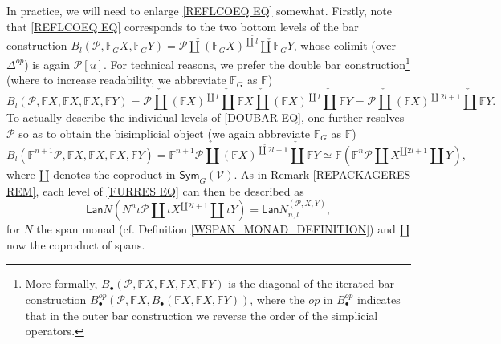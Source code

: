 \documentclass[a4paper,10pt
,draft
]{article}%
\numberwithin{equation}{section}
\numberwithin{figure}{section}
\theoremstyle{definition} %
\newcommand{\1}{\ensuremath{\mathbbm 1}}%
\begin{document}
In practice, we will need to enlarge 
\eqref{REFLCOEQ EQ} somewhat.
Firstly, note that \eqref{REFLCOEQ EQ}
corresponds to the two bottom levels of the bar construction
$B_l(\mathcal{P}, \mathbb{F}_G X, \mathbb{F}_G Y)=
\mathcal{P} \mathbin{\check{\amalg}}
(\mathbb{F}_G X)^{\check{\amalg} l} 
\mathbin{\check{\amalg}} \mathbb{F}_G Y$,
whose colimit (over $\Delta^{op}$) is again $\mathcal{P}[u]$.
For technical reasons, we prefer 
the double bar construction\footnote{
More formally,
$B_{\bullet}(\mathcal{P}, \mathbb{F} X, \mathbb{F} X, \mathbb{F} X, \mathbb{F} Y)$
is the diagonal
of the iterated bar construction
$B^{op}_{\bullet}\left(\mathcal{P}, \mathbb{F} X, 
B_{\bullet}(\mathbb{F} X, \mathbb{F} X, \mathbb{F} Y)\right)$,
where the $op$ in $B^{op}_{\bullet}$ indicates that in the outer bar construction we reverse the order of the simplicial operators.
}
(where to increase readability, we 
abbreviate $\mathbb{F}_G$ as $\mathbb{F}$)
\begin{equation}\label{DOUBAR EQ}
	B_l(\mathcal{P}, \mathbb{F} X, \mathbb{F} X, \mathbb{F} X, \mathbb{F} Y)
=
	\mathcal{P} \mathbin{\check{\amalg}}
	(\mathbb{F} X)^{\check{\amalg} l} 
	\mathbin{\check{\amalg}}
	\mathbb{F} X
	\mathbin{\check{\amalg}}
	(\mathbb{F} X)^{\check{\amalg} l} 
	\mathbin{\check{\amalg}} \mathbb{F} Y
=
	\mathcal{P} \mathbin{\check{\amalg}}
	(\mathbb{F} X)^{\check{\amalg} 2l+1} 
	\mathbin{\check{\amalg}} \mathbb{F} Y.
\end{equation}
To actually describe the individual levels of \eqref{DOUBAR EQ},
one further resolves $\mathcal{P}$
so as to obtain the bisimplicial object
(we again abbreviate $\mathbb{F}_G$ as $\mathbb{F}$)
\begin{equation}\label{FURRES EQ}
	B_l(\mathbb{F}^{n+1}\mathcal{P}, \mathbb{F} X, \mathbb{F} X, \mathbb{F} X, \mathbb{F} Y)
=
	\mathbb{F}^{n+1}\mathcal{P} \mathbin{\check{\amalg}}
	(\mathbb{F} X)^{\check{\amalg} 2l+1} 
	\mathbin{\check{\amalg}} \mathbb{F} Y
\simeq
	\mathbb{F}\left(
		\mathbb{F}^{n} \mathcal{P} \amalg
		X^{\amalg 2l+1} \amalg Y
	\right),
\end{equation}
where $\amalg$ denotes the coproduct in $\mathsf{Sym}_G(\mathcal{V})$.
As in Remark \ref{REPACKAGERES REM}, each level of 
\eqref{FURRES EQ}
can then be described as 
\begin{equation}\label{LANLEVELFOR EQ}
 \mathsf{Lan} N (N^{n} \iota \mathcal{P} 
\amalg \iota X^{\amalg 2l+1} \amalg \iota Y)
=
\mathsf{Lan} N^{(\mathcal P, X, Y)}_{n,l},
\end{equation}
for $N$ the span monad (cf. Definition \ref{WSPAN_MONAD_DEFINITION}) and $\amalg$ now the coproduct of spans.
\end{document}
